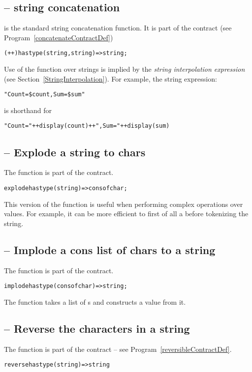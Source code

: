 \subsection{\q{++} -- string concatenation}
\label{stringConcatFunction}
\q{++} is the standard string concatenation function. It is part of the  contract (see Program~\vref{concatenateContractDef})
\begin{alltt}
(++) has type (string,string)=>string;
\end{alltt}

Use of the \q{++} function over strings is implied by the \emph{string interpolation expression} (see Section~\vref{StringInterpolation}). For example, the string expression:
\begin{alltt}
"Count = \$count, Sum=\$sum"
\end{alltt}
is shorthand for
\begin{alltt}
"Count ="++display(count)++", Sum="++display(sum)
\end{alltt}

\subsection{ -- Explode a string to chars}
\label{stringExplodeFunction}
The  function is part of the  contract.
\begin{alltt}
explode has type (string)=>cons of char;
\end{alltt}
\begin{aside}
This version of the  function is useful when performing complex operations over  values. For example, it can be more efficient to first of all  a  before tokenizing the string.
\end{aside}

\subsection{ -- Implode a cons list of chars to a string}
\label{stringImplodeFunction}
The  function is part of the  contract.
\begin{alltt}
implode has type (cons of char)=>string;
\end{alltt}
The  function takes a  list of s and constructs a  value from it.

\subsection{ -- Reverse the characters in a string}
\label{stringReverseFunction}
The  function is part of the  contract -- see Program~\vref{reversibleContractDef}.
\begin{alltt}
reverse has type (string)=>string
\end{alltt}

